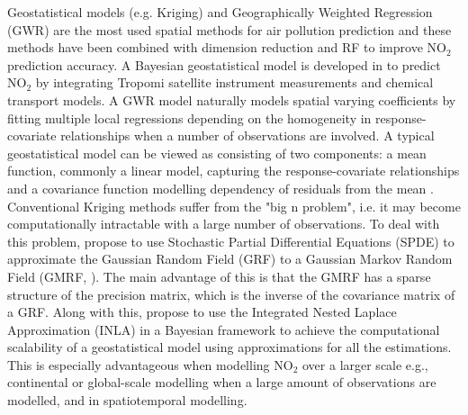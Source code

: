 \documentclass{article}
\begin{document}
Geostatistical models (e.g. Kriging) and Geographically Weighted Regression (GWR) are the most used spatial methods for air pollution prediction \citep{vicedo2013bayesian,li2014estimating,wang2021impacts,zou2016high} and these methods have been combined with dimension reduction \cite{zhai2018improved} and RF \citep{zhan2018satellite,liu2020integrate} to improve NO$_2$ prediction accuracy. A Bayesian geostatistical model is developed in \cite{BELOCONI2020105578} to predict NO$_2$ by integrating Tropomi satellite instrument measurements and chemical transport models. A GWR model naturally models spatial varying coefficients by fitting multiple local regressions depending on the homogeneity in response-covariate relationships when a number of observations are involved. A typical geostatistical model can be viewed as consisting of two components: a mean function, commonly a linear model, capturing the response-covariate relationships and a covariance function modelling dependency of residuals from the mean \citep{stackinla}. Conventional Kriging methods suffer from the "big n problem", i.e. it may become computationally intractable with a large number of observations. To deal with this problem, \cite{lindgren2011explicit} propose to use Stochastic Partial Differential Equations (SPDE) to approximate the Gaussian Random Field (GRF) to a Gaussian Markov Random Field (GMRF, \cite{rue2005gaussian}). The main advantage of this is that the GMRF has a sparse structure of the precision matrix, which is the inverse of the covariance matrix of a GRF. Along with this, \cite{rue2009approximate} propose to use the Integrated Nested Laplace Approximation (INLA) in a Bayesian framework to achieve the computational scalability of a geostatistical model using approximations for all the estimations. This is especially advantageous when  modelling NO$_2$ over a larger scale e.g., continental or global-scale modelling when a large amount of observations are modelled, and in spatiotemporal modelling.



\end{document}
